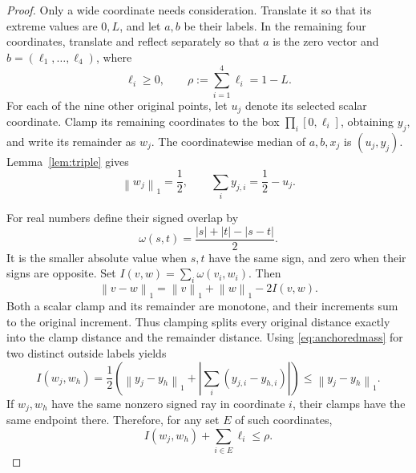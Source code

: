 \documentclass[11pt]{article}
\theoremstyle{definition}
\theoremstyle{remark}
\newcommand{\norm}[1]{\left\lVert#1\right\rVert_1}
\newcommand{\abs}[1]{\left|#1\right|}
\begin{document}
\begin{proof}
Only a wide coordinate needs consideration. Translate it so that its
extreme values are $0,L$, and let $a,b$ be their labels. In the remaining
four coordinates, translate and reflect separately so that $a$ is the
zero vector and $b=(\ell_1,\ldots,\ell_4)$, where
\[
 \ell_i\geq0,\qquad \rho:=\sum_{i=1}^4\ell_i=1-L.
\]
For each of the nine other original points, let $u_j$ denote its selected
scalar coordinate. Clamp its remaining coordinates to the box
$\prod_i[0,\ell_i]$, obtaining $y_j$, and write its remainder as $w_j$.
The coordinatewise median of $a,b,x_j$ is $(u_j,y_j)$.
Lemma~\ref{lem:triple} gives
\begin{equation}\label{eq:anchoredmass}
 \norm{w_j}=\frac12,\qquad
 \sum_i y_{j,i}=\frac12-u_j.
\end{equation}

For real numbers define their signed overlap by
\[
 \omega(s,t)=\frac{\abs{s}+\abs{t}-\abs{s-t}}2.
\]
It is the smaller absolute value when $s,t$ have the same sign, and zero
when their signs are opposite. Set $I(v,w)=\sum_i\omega(v_i,w_i)$.
Then
\begin{equation}\label{eq:overlapidentity}
 \norm{v-w}=\norm v+\norm w-2I(v,w).
\end{equation}
Both a scalar clamp and its remainder are monotone, and their increments
sum to the original increment. Thus clamping splits every original
distance exactly into the clamp distance and the remainder distance.
Using \eqref{eq:anchoredmass} for two distinct outside labels yields
\begin{equation}\label{eq:anchoredoverlap}
 I(w_j,w_h)=\frac12\left(
  \norm{y_j-y_h}+\abs{\sum_i(y_{j,i}-y_{h,i})}\right)
 \leq\norm{y_j-y_h}.
\end{equation}
If $w_j,w_h$ have the same nonzero signed ray in coordinate $i$, their
clamps have the same endpoint there. Therefore, for any set $E$ of such
coordinates,
\begin{equation}\label{eq:anchorpaid}
 I(w_j,w_h)+\sum_{i\in E}\ell_i\leq\rho.
\end{equation}


\end{proof}
\end{document}

